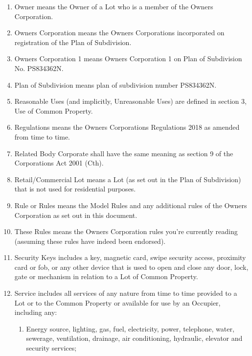 \documentclass{article}
\begin{document}
\begin{enumerate}[label=\arabic*.]
\begin{enumerate}[label=\arabic{enumi}.\arabic*.]
\begin{enumerate}[label=(\arabic*)]
\item  Owner means the Owner of a Lot who is a member of the Owners Corporation.

\item  Owners Corporation means the Owners Corporations incorporated on registration of the Plan of Subdivision.

\item  Owners Corporation 1 means Owners Corporation 1 on Plan of Subdivision No. PS834362N.

\item  Plan of Subdivision means plan of subdivision number PS834362N.

\item Reasonable Uses (and implicitly, Unreasonable Uses) are defined in section 3, Use of Common Property.

\item  Regulations means the Owners Corporations Regulations 2018 as amended from time to time.

\item  Related Body Corporate shall have the same meaning as section 9 of the Corporations Act 2001 (Cth).

\item  Retail/Commercial Lot means a Lot (as set out in the Plan of Subdivision) that is not used for residential purposes.

\item  Rule or Rules means the Model Rules and any additional rules of the Owners Corporation as set out in this document.

\item These Rules means the Owners Corporation rules you're currently reading (assuming these rules have indeed been endorsed).
\item  Security Keys includes a key, magnetic card, swipe security access, proximity card or fob, or any other device that is used to open and close any door, lock, gate or mechanism in relation to a Lot of Common Property.

\item  Service includes all services of any nature from time to time provided to a Lot or to the Common Property or available for use by an Occupier, including any:

\begin{enumerate}[label=(\alph*)]

\item  Energy source, lighting, gas, fuel, electricity, power, telephone, water, sewerage, ventilation, drainage, air conditioning, hydraulic, elevator and security services;


\end{enumerate}
\end{enumerate}
\end{enumerate}
\end{enumerate}
\end{document}
